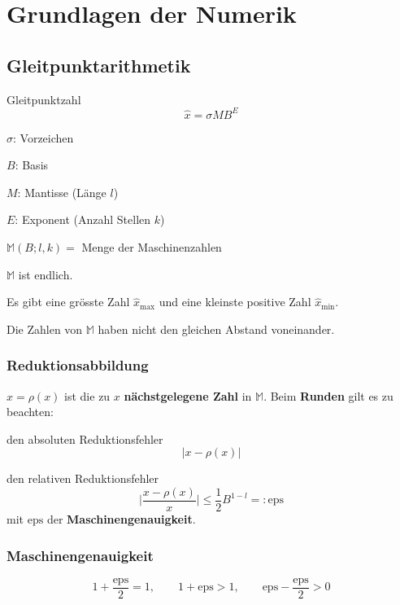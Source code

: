 
\section{Grundlagen der Numerik}
	\subsection{Gleitpunktarithmetik} Gleitpunktzahl
		\[
			\hat x = \sigma M B^E
		\]
		\begin{tightitemize}
			\item[$\sigma$:] Vorzeichen
			\item[$B$:] Basis
			\item[$M$:] Mantisse (Länge $l$)
			\item[$E$:] Exponent (Anzahl Stellen $k$)
		\end{tightitemize}

		$\mathbb{M} (B; l, k) = $ Menge der Maschinenzahlen
		\begin{tightitemize}
			\item $\mathbb{M}$ ist endlich.
			\item Es gibt eine grösste Zahl $\hat x_{\text{max}}$ und eine kleinste positive Zahl $\hat x_\text{min}$.
			\item Die Zahlen von $\mathbb{M}$ haben nicht den gleichen Abstand voneinander.
		\end{tightitemize}

		\subsubsection{Reduktionsabbildung}
			$\hat x = \rho(x)$ ist die zu $x$ \textbf{nächstgelegene Zahl} in $\mathbb{M}$. Beim \textbf{Runden} gilt es zu beachten:
			\begin{tightenumerate}
				\item den absoluten Reduktionsfehler
				\[ |x-\rho(x)|\]
				\item den relativen Reduktionsfehler
				\[ \Big\vert \frac{x-\rho(x)}{x}\Big\vert \leq \frac{1}{2}B^{1-l} =: \mathrm{eps}\]
				mit $\mathrm{eps}$ der \textbf{Maschinengenauigkeit}.
			\end{tightenumerate}

		\subsubsection{Maschinengenauigkeit}
			\[
				1 + \frac{\mathrm{eps}}{2} = 1, \qquad 1 + \mathrm{eps} > 1, \qquad \mathrm{eps} - \frac{\mathrm{eps}}{2} > 0
			\]

